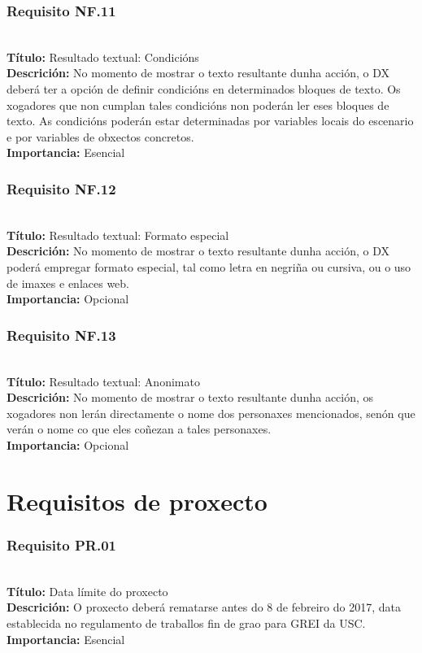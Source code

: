 \subsubsection{Requisito NF.11}~\\
{\bf Título:} Resultado textual: Condicións\\
{\bf Descrición:} No momento de mostrar o texto resultante dunha acción, o DX
deberá ter a opción de definir condicións en determinados bloques de texto. Os
xogadores que non cumplan tales condicións non poderán ler eses bloques de
texto. As condicións poderán estar determinadas por variables locais do
escenario e por variables de obxectos concretos.\\
{\bf Importancia:} Esencial

\subsubsection{Requisito NF.12}~\\
{\bf Título:} Resultado textual: Formato especial\\
{\bf Descrición:} No momento de mostrar o texto resultante dunha acción, o DX
poderá empregar formato especial, tal como letra en negriña ou cursiva, ou o
uso de imaxes e enlaces web.\\
{\bf Importancia:} Opcional

\subsubsection{Requisito NF.13}~\\
{\bf Título:} Resultado textual: Anonimato\\
{\bf Descrición:} No momento de mostrar o texto resultante dunha acción, os
xogadores non lerán directamente o nome dos personaxes mencionados, senón que
verán o nome co que eles coñezan a tales personaxes.\\
{\bf Importancia:} Opcional



\section{Requisitos de proxecto}
\subsubsection{Requisito PR.01}~\\
{\bf Título:} Data límite do proxecto\\
{\bf Descrición:} O proxecto deberá rematarse antes do 8 de febreiro do 2017,
data establecida no regulamento de traballos fin de grao para GREI da USC.\\
{\bf Importancia:} Esencial

